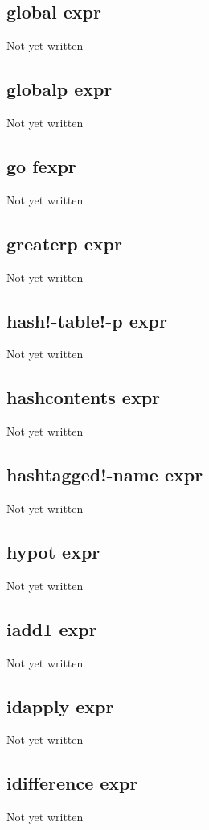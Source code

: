 \documentclass[a4paper,11pt]{article}
\begin{document}
\subsection{\ttfamily global expr}
Not yet written

\subsection{\ttfamily globalp expr}
Not yet written

\subsection{\ttfamily go fexpr}
Not yet written

\subsection{\ttfamily greaterp expr}
Not yet written

\subsection{\ttfamily hash!-table!-p expr}
Not yet written

\subsection{\ttfamily hashcontents expr}
Not yet written

\subsection{\ttfamily hashtagged!-name expr}
Not yet written

\subsection{\ttfamily hypot expr}
Not yet written

\subsection{\ttfamily iadd1 expr}
Not yet written

\subsection{\ttfamily idapply expr}
Not yet written

\subsection{\ttfamily idifference expr}
Not yet written
\end{document}
